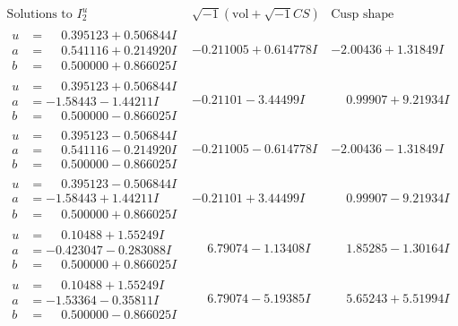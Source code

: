 \documentclass[1p]{elsarticle_modified}
\theoremstyle{definition}
\newcommand{\I}{\sqrt{-1}}
\begin{document}
$$\begin{array}{c|c|c}  
\text{Solutions to }I^u_{2}& \I (\text{vol} + \sqrt{-1}CS) & \text{Cusp shape}\\
 \hline 
\begin{aligned}
u &= \phantom{-}0.395123 + 0.506844 I \\
a &= \phantom{-}0.541116 + 0.214920 I \\
b &= \phantom{-}0.500000 + 0.866025 I\end{aligned}
 & -0.211005 + 0.614778 I & -2.00436 + 1.31849 I \\ \hline\begin{aligned}
u &= \phantom{-}0.395123 + 0.506844 I \\
a &= -1.58443 - 1.44211 I \\
b &= \phantom{-}0.500000 - 0.866025 I\end{aligned}
 & -0.21101 - 3.44499 I & \phantom{-}0.99907 + 9.21934 I \\ \hline\begin{aligned}
u &= \phantom{-}0.395123 - 0.506844 I \\
a &= \phantom{-}0.541116 - 0.214920 I \\
b &= \phantom{-}0.500000 - 0.866025 I\end{aligned}
 & -0.211005 - 0.614778 I & -2.00436 - 1.31849 I \\ \hline\begin{aligned}
u &= \phantom{-}0.395123 - 0.506844 I \\
a &= -1.58443 + 1.44211 I \\
b &= \phantom{-}0.500000 + 0.866025 I\end{aligned}
 & -0.21101 + 3.44499 I & \phantom{-}0.99907 - 9.21934 I \\ \hline\begin{aligned}
u &= \phantom{-}0.10488 + 1.55249 I \\
a &= -0.423047 - 0.283088 I \\
b &= \phantom{-}0.500000 + 0.866025 I\end{aligned}
 & \phantom{-}6.79074 - 1.13408 I & \phantom{-}1.85285 - 1.30164 I \\ \hline\begin{aligned}
u &= \phantom{-}0.10488 + 1.55249 I \\
a &= -1.53364 - 0.35811 I \\
b &= \phantom{-}0.500000 - 0.866025 I\end{aligned}
 & \phantom{-}6.79074 - 5.19385 I & \phantom{-}5.65243 + 5.51994 I \\ \hline\begin{aligned}

\end{aligned}
\end{array}$$
\end{document}
